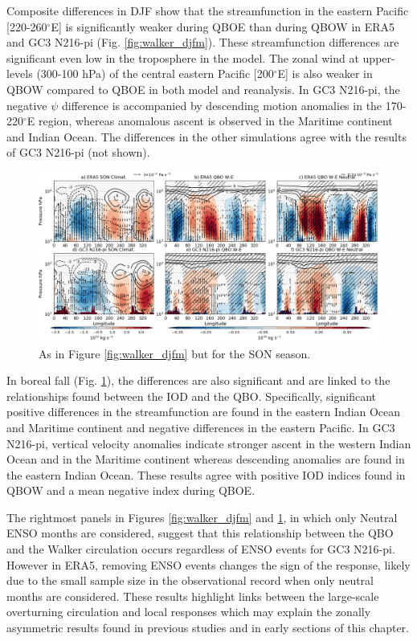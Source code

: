 Composite differences in DJF show that the streamfunction in the eastern Pacific [220-260$^\circ$E] is significantly weaker during QBOE than during QBOW in ERA5 and GC3 N216-pi (Fig. \ref{fig:walker_djfm}). These streamfunction differences are significant even low in the troposphere in the model. The zonal wind at upper-levels (300-100 hPa) of the central eastern Pacific [200$^\circ$E] is also weaker in QBOW compared to QBOE  in both model and reanalysis. In GC3 N216-pi, the negative $\psi$ difference is accompanied by descending motion anomalies in the 170-220$^\circ$E region, whereas anomalous ascent is observed in the Maritime continent and Indian Ocean. The differences in the other simulations agree with the results of GC3 N216-pi (not shown).

\begin{figure}[t!]
\centering
 \noindent
 \includegraphics[width=\linewidth]{figures/cmip_era5_streamson.png}
\caption[Walker circulation anomalies in SON]{As in Figure \ref{fig:walker_djfm} but for the SON season. }
\label{fig:walker_son}
\end{figure}

In boreal fall (Fig. \ref{fig:walker_son}), the differences are also significant and are linked to the relationships found between the IOD and the QBO. 
Specifically, significant positive differences in the streamfunction are found 
in the eastern Indian Ocean and Maritime continent and negative differences in the eastern Pacific. 
In GC3 N216-pi, vertical velocity anomalies indicate stronger ascent in the western Indian Ocean and in the Maritime continent whereas descending anomalies are found in the eastern Indian Ocean. These results agree with positive IOD indices found in QBOW and a mean negative index during QBOE.

The rightmost panels in  Figures \ref{fig:walker_djfm} and \ref{fig:walker_son}, in which only Neutral ENSO months are considered, suggest that this relationship between the QBO and the Walker circulation occurs regardless of ENSO events for GC3 N216-pi. However in ERA5, removing ENSO events changes the sign of the response, likely due to the small sample size in the observational record when only neutral months are considered. 
These results highlight links between the large-scale overturning circulation and local responses which may explain the zonally asymmetric results found in previous studies and in early sections of this chapter.

